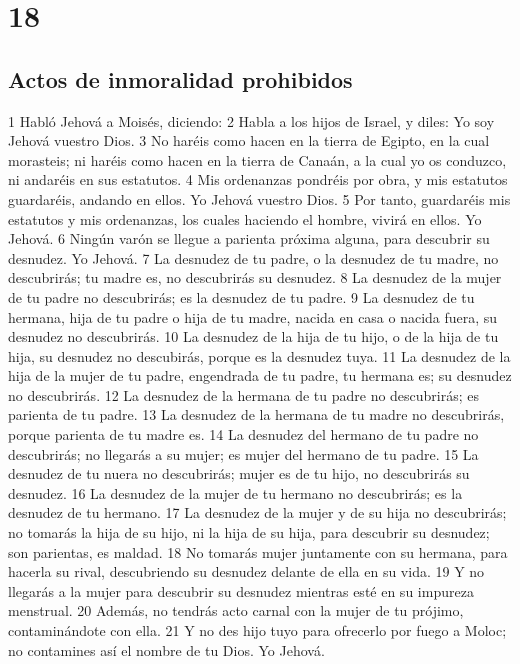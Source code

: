 \chapter{18}

\section*{Actos de inmoralidad prohibidos}

1 Habló Jehová a Moisés, diciendo:
2 Habla a los hijos de Israel, y diles: Yo soy Jehová vuestro Dios.
3 No haréis como hacen en la tierra de Egipto, en la cual morasteis; ni haréis como hacen en la tierra de Canaán, a la cual yo os conduzco, ni andaréis en sus estatutos.
4 Mis ordenanzas pondréis por obra, y mis estatutos guardaréis, andando en ellos. Yo Jehová vuestro Dios.
5 Por tanto, guardaréis mis estatutos y mis ordenanzas, los cuales haciendo el hombre, vivirá en ellos. Yo Jehová.
6 Ningún varón se llegue a parienta próxima alguna, para descubrir su desnudez. Yo Jehová.
7 La desnudez de tu padre, o la desnudez de tu madre, no descubrirás; tu madre es, no descubrirás su desnudez.
8 La desnudez de la mujer de tu padre no descubrirás; es la desnudez de tu padre.
9 La desnudez de tu hermana, hija de tu padre o hija de tu madre, nacida en casa o nacida fuera, su desnudez no descubrirás.
10 La desnudez de la hija de tu hijo, o de la hija de tu hija, su desnudez no descubirás, porque es la desnudez tuya.
11 La desnudez de la hija de la mujer de tu padre, engendrada de tu padre, tu hermana es; su desnudez no descubrirás.
12 La desnudez de la hermana de tu padre no descubrirás; es parienta de tu padre.
13 La desnudez de la hermana de tu madre no descubrirás, porque parienta de tu madre es.
14 La desnudez del hermano de tu padre no descubrirás; no llegarás a su mujer; es mujer del hermano de tu padre.
15 La desnudez de tu nuera no descubrirás; mujer es de tu hijo, no descubrirás su desnudez.
16 La desnudez de la mujer de tu hermano no descubrirás; es la desnudez de tu hermano.
17 La desnudez de la mujer y de su hija no descubrirás; no tomarás la hija de su hijo, ni la hija de su hija, para descubrir su desnudez; son parientas, es maldad.
18 No tomarás mujer juntamente con su hermana, para hacerla su rival, descubriendo su desnudez delante de ella en su vida.
19 Y no llegarás a la mujer para descubrir su desnudez mientras esté en su impureza menstrual.
20 Además, no tendrás acto carnal con la mujer de tu prójimo, contaminándote con ella.
21 Y no des hijo tuyo para ofrecerlo por fuego a Moloc; no contamines así el nombre de tu Dios. Yo Jehová.
